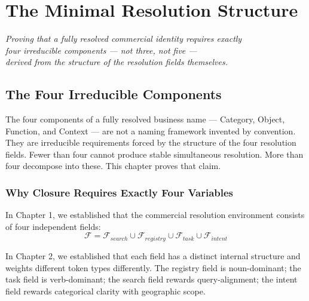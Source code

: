 \documentclass[12pt, openany]{book}
\theoremstyle{thmstyle}
\theoremstyle{defstyle}
\begin{document}
\tableofcontents
\newpage

\part{The Minimal Resolution Structure}

\vspace{16pt}
\begin{center}
\color{accentgray}\itshape
Proving that a fully resolved commercial identity requires exactly\\
four irreducible components --- not three, not five ---\\
derived from the structure of the resolution fields themselves.
\end{center}

\chapter{The Four Irreducible Components}

\begin{keybox}
The four components of a fully resolved business name --- Category, Object, Function, and Context --- are not a naming framework invented by convention. They are irreducible requirements forced by the structure of the four resolution fields. Fewer than four cannot produce stable simultaneous resolution. More than four decompose into these. This chapter proves that claim.
\end{keybox}

\section{Why Closure Requires Exactly Four Variables}

In Chapter 1, we established that the commercial resolution environment consists of four independent fields:
\[
\mathcal{F} = \mathcal{F}_{search} \cup \mathcal{F}_{registry} \cup \mathcal{F}_{task} \cup \mathcal{F}_{intent}
\]

In Chapter 2, we established that each field has a distinct internal structure and weights different token types differently. The registry field is noun-dominant; the task field is verb-dominant; the search field rewards query-alignment; the intent field rewards categorical clarity with geographic scope.
\end{document}
